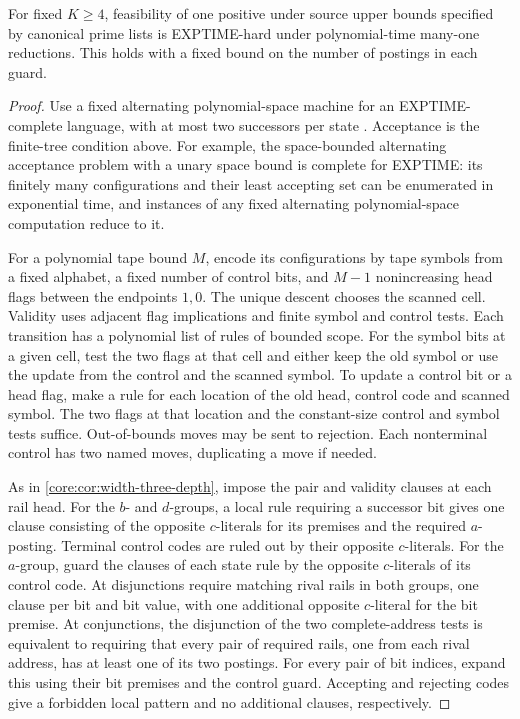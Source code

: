 \begin{corollary}
\label{core:cor:exptime-bounded-source}
For fixed $K\ge4$, feasibility of one positive under source upper
bounds specified by canonical prime lists is EXPTIME-hard under
polynomial-time many-one reductions. This holds with a fixed bound
on the number of postings in each guard.
\end{corollary}
\begin{proof}
Use a fixed alternating polynomial-space machine for an
EXPTIME-complete language, with at most two successors per state
\cite[Corollary~3.6 and proof of Theorem~5.4]{ChandraKozenStockmeyer1981}.
Acceptance is the finite-tree
condition above. For example, the space-bounded alternating
acceptance problem with a unary space bound is complete for
EXPTIME: its finitely many configurations and their least accepting
set can be enumerated in exponential time, and instances of any
fixed alternating polynomial-space computation reduce to it.

For a polynomial tape bound $M$, encode its configurations by tape
symbols from a fixed alphabet, a fixed number of control bits, and
$M-1$ nonincreasing head flags between the endpoints $1,0$.
The unique descent chooses the scanned cell. Validity uses adjacent
flag implications and finite symbol and control tests. Each transition
has a polynomial list of rules of bounded scope. For the symbol bits
at a given cell, test the two flags at that cell and either keep the
old symbol or use the update from the control and the scanned symbol.
To update a control bit or a head flag, make a rule for each location
of the old head, control code and scanned symbol. The two flags at
that location and the constant-size control and symbol tests suffice.
Out-of-bounds moves may be sent to rejection. Each nonterminal
control has two named moves, duplicating a move if needed.

As in \cref{core:cor:width-three-depth}, impose the pair and validity
clauses at each rail head. For the $b$- and $d$-groups, a local rule
requiring a successor bit gives one clause consisting of the opposite
$c$-literals for its premises and the required $a$-posting. Terminal
control codes are ruled out by their opposite $c$-literals. For the
$a$-group, guard the clauses of each state rule by the opposite
$c$-literals of its control code. At disjunctions require matching
rival rails in both groups, one clause per bit and bit value, with
one additional opposite $c$-literal for the bit premise. At
conjunctions, the disjunction of the two complete-address tests
is equivalent to requiring that every pair of required rails, one
from each rival address, has at least one of its two postings.
For every pair of bit indices, expand this using their bit premises
and the control guard. Accepting and rejecting codes give a
forbidden local pattern and no additional clauses, respectively.


\end{proof}
